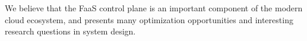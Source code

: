 We believe that the FaaS control plane is an important component of the modern cloud ecosystem, and presents many optimization opportunities and interesting research questions in system design. 

